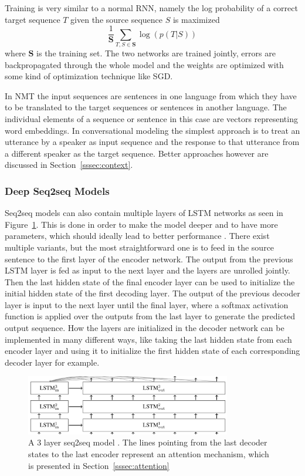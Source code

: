 \documentclass[12pt]{article}
\begin{document}
Training is very similar to a normal RNN, namely the log probability of a correct target sequence \(T\) given the source sequence \(S\) is maximized
\begin{equation} \label{eq232b}
\frac{1}{\bm{S}}\sum_{T,S \in \bm{S}}\log(p(T|S))
\end{equation}
where \(\bm{S}\) is the training set. The two networks are trained jointly, errors are backpropagated through the whole model and the weights are optimized with some kind of optimization technique like SGD.

In NMT the input sequences are sentences in one language from which they have to be translated to the target sequences or sentences in another language. The individual elements of a sequence or sentence in this case are vectors representing word embeddings. In conversational modeling the simplest approach is to treat an utterance by a speaker as input sequence and the response to that utterance from a different speaker as the target sequence. Better approaches however are discussed in Section~\ref{sssec:context}.
\subsubsection{Deep Seq2seq Models}
Seq2seq models can also contain multiple layers of LSTM networks as seen in Figure~\ref{fig:232b}. This is done in order to make the model deeper and to have more parameters, which should ideally lead to better performance \cite{Vinyals:2015,googleNMT:2016}. There exist multiple variants, but the most straightforward one is to feed in the source sentence to the first layer of the encoder network. The output from the previous LSTM layer is fed as input to the next layer and the layers are unrolled jointly. Then the last hidden state of the final encoder layer can be used to initialize the initial hidden state of the first decoding layer. The output of the previous decoder layer is input to the next layer until the final layer, where a softmax activation function is applied over the outputs from the last layer to generate the predicted output sequence. How the layers are initialized in the decoder network can be implemented in many different ways, like taking the last hidden state from each encoder layer and using it to initialize the first hidden state of each corresponding decoder layer for example.

\begin{figure}[H]
	\centering
	\includegraphics[width=0.8\textwidth]{pics/deep_seq2seq.png}
	\caption{A 3 layer seq2seq model \cite{deep_seq2seq}. The lines pointing from the last decoder states to the last encoder represent an attention mechanism, which is presented in Section~\ref{sssec:attention}}
	\label{fig:232b}
\end{figure}
\end{document}
